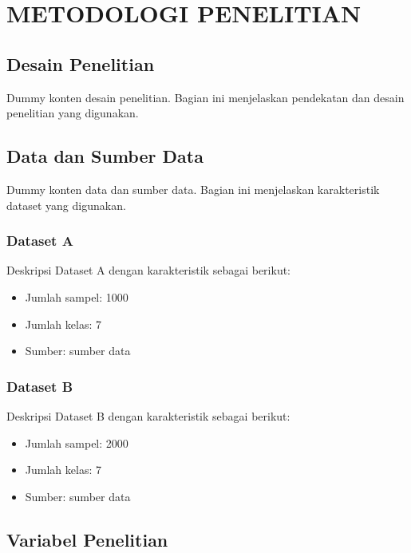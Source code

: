 \chapter{METODOLOGI PENELITIAN}
\label{bab:metodologi}

\section{Desain Penelitian}
\label{sec:desain}

Dummy konten desain penelitian. Bagian ini menjelaskan pendekatan dan desain penelitian yang digunakan.

\section{Data dan Sumber Data}
\label{sec:data}

Dummy konten data dan sumber data. Bagian ini menjelaskan karakteristik dataset yang digunakan.

\subsection{Dataset A}
\label{subsec:dataset_a}

Deskripsi Dataset A dengan karakteristik sebagai berikut:

\begin{itemize}
    \item Jumlah sampel: 1000
    \item Jumlah kelas: 7
    \item Sumber: sumber data
\end{itemize}

\subsection{Dataset B}
\label{subsec:dataset_b}

Deskripsi Dataset B dengan karakteristik sebagai berikut:

\begin{itemize}
    \item Jumlah sampel: 2000
    \item Jumlah kelas: 7
    \item Sumber: sumber data
\end{itemize}

\section{Variabel Penelitian}
\label{sec:variabel}

